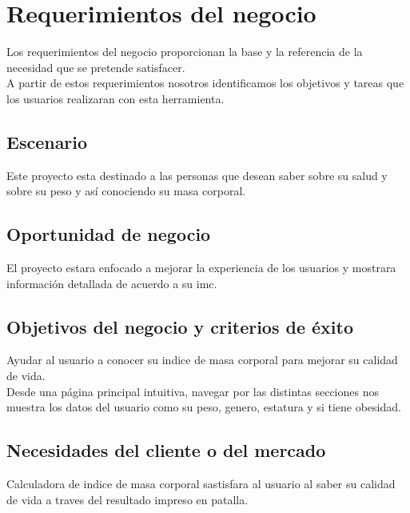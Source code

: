 \documentclass[12pt,a4paper]{book}
\begin{document}
\chapter{Requerimientos del negocio}
Los requerimientos del negocio proporcionan la base y la referencia de la necesidad que se pretende satisfacer.\\
A partir de estos requerimientos nosotros identificamos los objetivos y tareas que los usuarios realizaran con esta herramienta.
\section{Escenario}
\vspace{0.5 cm}
Este proyecto esta destinado a las personas que desean saber sobre su salud y sobre su peso y así conociendo su masa corporal.
\section{Oportunidad de negocio}
\vspace{0.5 cm}
El proyecto estara enfocado a mejorar la experiencia de los usuarios y mostrara información detallada de acuerdo a su imc.
\section{Objetivos del negocio y criterios de éxito}
\vspace{0.5 cm}
Ayudar al usuario a conocer su indice de masa corporal para mejorar su calidad de
vida.\\ 
Desde una página principal intuitiva, navegar por las distintas secciones nos muestra los datos del usuario como su peso, genero, estatura y si tiene obesidad. 
\newpage
\vspace{0.5 cm}
\section{Necesidades del cliente o del mercado}
\vspace{0.5 cm}
Calculadora de indice de masa corporal sastisfara al usuario al saber su calidad de vida a traves del resultado impreso en patalla.\\
\end{document}
